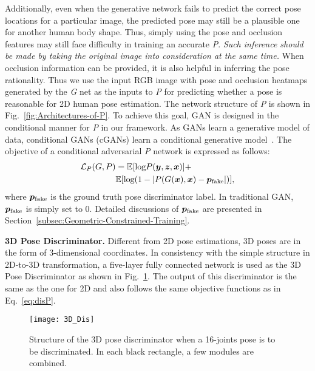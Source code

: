 \documentclass[10pt,journal,compsoc]{IEEEtran}
\begin{document}
Additionally, even when the generative network fails to predict the correct pose locations for a particular image, the predicted pose may still be a plausible one for another human body shape.
Thus, simply using the pose and occlusion features may still face difficulty in training an accurate \textit{P}.
{\it Such inference should be made by taking the original image into consideration at the same time.}
When occlusion information can be provided, it is also helpful in inferring the pose rationality.
Thus we use the input RGB image with pose and occlusion heatmaps generated by the \textit{G} net as the inputs to \textit{P} for predicting whether a pose is reasonable for 2D human pose estimation.
The network structure of \textit{P} is shown in Fig.~\ref{fig:Architectures-of-P}.
To achieve this goal, GAN is designed in the conditional manner for \textit{P} in our framework.
As GANs learn a generative model of data, conditional GANs (cGANs) learn a conditional generative model~\cite{conf/nips/GoodfellowPMXWOCB14}.
The objective of a conditional adversarial \textit{P} network is expressed as follows:
\begin{align}
\label{eq:disP}
\mathcal{L}_{P}(G,P) &= \mathbb{E}[\textrm{log}P(\bm{y},\bm{z},\bm{x})]  +   \notag  \\
  &  \mathbb{E}[\textrm{log}(1-\vert P(G(\bm{x}),\bm{x})  -\bm{p}_{\rm  fake} \vert)],
\end{align}
where $\bm{p}_{\rm  fake}$ is the ground truth pose discriminator label. In traditional GAN,  $\bm{p}_{\rm  fake}$ is simply set to  0.
Detailed discussions of $\bm{p}_{\rm  fake}$
are presented in Section~\ref{subsec:Geometric-Constrained-Training}.




\vspace{0.3em}
\noindent \textbf{3D   Pose  Discriminator.}
Different from 2D pose estimations, 3D poses are in the form of 3-dimensional coordinates.
In consistency with the simple structure in 2D-to-3D transformation, a five-layer fully connected network is used as the 3D Pose Discriminator as shown in Fig.~\ref{fig:3d_Dis}.
The output of this discriminator is the same as the one for 2D and also follows the same objective functions as in Eq.~\eqref{eq:disP}.


\begin{figure}[t!]
\centering
\texttt{[image: 3D\_Dis]}
\caption{Structure of the 3D pose discriminator when a 16-joints pose is to be discriminated. In each black rectangle, a few modules are combined.}
\label{fig:3d_Dis}
\end{figure}
\end{document}
